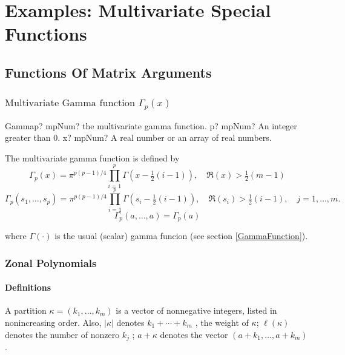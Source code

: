 \chapter{Examples: Multivariate Special Functions}


\section{Functions Of Matrix Arguments}
\label{FunctionsOfMatrixArguments}



\subsection{\texorpdfstring{$\text{Multivariate Gamma function }\Gamma_p(x)$}{Multivariate Gamma}}
\label{MultivariateGammaFunction} 


\begin{mpFunctionsExtract}
	\mpFunctionTwoNotImplemented
	{Gammap? mpNum? the multivariate gamma function.}
	{p? mpNum? An integer greater than 0.}
	{x? mpNum? A real number or an array of real numbers.}	
\end{mpFunctionsExtract}


\vspace{0.3cm}
The multivariate gamma function is defined by
\begin{equation}
	\Gamma_p(x)  = \pi^{p(p-1)/4} \prod_{i=1}^p \Gamma\left(x-\tfrac{1}{2}(i-1)\right), \quad \Re(x) > \tfrac{1}{2}(m-1)
\end{equation}
\begin{equation}
	\Gamma_p(s_1,\ldots,s_p)  = \pi^{p(p-1)/4} \prod_{i=1}^p \Gamma\left(s_i-\tfrac{1}{2}(i-1)\right), \quad \Re(s_i) > \tfrac{1}{2}(i-1), \quad j=1,\ldots,m.
\end{equation}
\begin{equation}
	\Gamma_p(a,\ldots,a)  = \Gamma_p(a)
\end{equation}

where $\Gamma(\cdot)$ is the usual (scalar) gamma funcion (see section \ref{GammaFunction}).





\newpage
\subsection{Zonal Polynomials}
\label{ZonalPolynomials}

\subsubsection{Definitions}
A partition $\kappa = (k_1 , . . . , k_m)$ is a vector of nonnegative integers, listed in nonincreasing order. Also, $|\kappa|$ denotes $k_1 + \cdots +k_m$ , the weight of $\kappa$; $\ell(\kappa)$ denotes the number of nonzero $k_j$ ; $a+\kappa$ denotes the vector $(a+k_1,\ldots, a+k_m )$.

